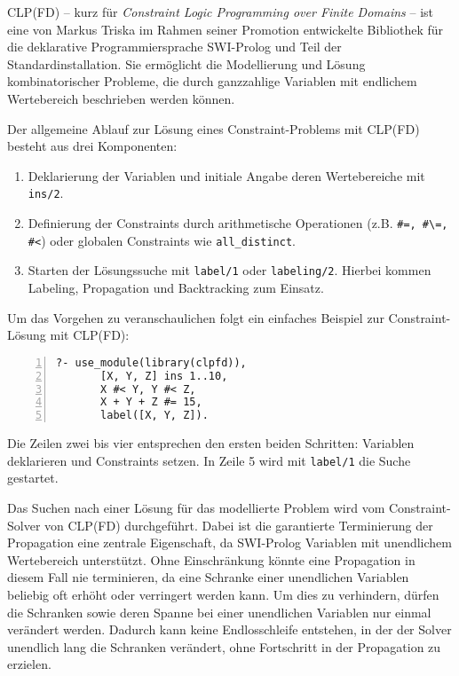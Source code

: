 \documentclass[12pt,a4paper]{article}
\begin{document}
CLP(FD) -- kurz für \emph{Constraint Logic Programming over Finite Domains} -- ist eine von Markus Triska im Rahmen seiner Promotion entwickelte Bibliothek für die deklarative Programmiersprache SWI-Prolog und Teil der Standardinstallation. 
Sie ermöglicht die Modellierung und Lösung kombinatorischer Probleme, die durch ganzzahlige Variablen mit endlichem Wertebereich beschrieben werden können.

Der allgemeine Ablauf zur Lösung eines Constraint-Problems mit CLP(FD) besteht aus drei Komponenten:
\begin{enumerate}
    \item Deklarierung der Variablen und initiale Angabe deren Wertebereiche mit \texttt{ins/2}.
    \item Definierung der Constraints durch arithmetische Operationen (z.B. \texttt{\#=, \#\textbackslash=, \#<}) oder globalen Constraints wie \texttt{all\_distinct}.
    \item Starten der Lösungssuche mit \texttt{label/1} oder \texttt{labeling/2}. Hierbei kommen Labeling, Propagation und Backtracking zum Einsatz.
\end{enumerate}

\noindent
Um das Vorgehen zu veranschaulichen folgt ein einfaches Beispiel zur Constraint-Lösung mit CLP(FD):

\begin{Verbatim}[numbers=left, xleftmargin=5mm, frame=lines]
    ?- use_module(library(clpfd)),
       [X, Y, Z] ins 1..10,
       X #< Y, Y #< Z,
       X + Y + Z #= 15,
       label([X, Y, Z]).
\end{Verbatim}

\noindent
Die Zeilen zwei bis vier entsprechen den ersten beiden Schritten: Variablen deklarieren und Constraints setzen.
In Zeile 5 wird mit \texttt{label/1} die Suche gestartet. 

Das Suchen nach einer Lösung für das modellierte Problem wird vom Constraint-Solver von CLP(FD) durchgeführt.
Dabei ist die garantierte Terminierung der Propagation eine zentrale Eigenschaft, da SWI-Prolog Variablen mit unendlichem Wertebereich unterstützt.
Ohne Einschränkung könnte eine Propagation in diesem Fall nie terminieren, da eine Schranke einer unendlichen Variablen beliebig oft erhöht oder verringert werden kann.
Um dies zu verhindern, dürfen die Schranken sowie deren Spanne bei einer unendlichen Variablen nur einmal verändert werden.
Dadurch kann keine Endlosschleife entstehen, in der der Solver unendlich lang die Schranken verändert, ohne Fortschritt in der Propagation zu erzielen.
\end{document}
